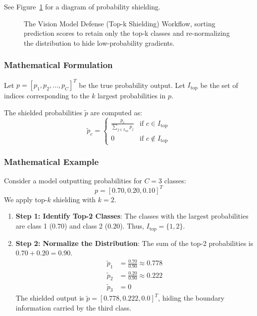 \documentclass{article}
\begin{document}
See Figure~\ref{fig:defense_vision_models} for a diagram of probability shielding.

\begin{figure}[htbp]
    \centering
    \caption{The Vision Model Defense (Top-k Shielding) Workflow, sorting prediction scores to retain only the top-k classes and re-normalizing the distribution to hide low-probability gradients.}
    \label{fig:defense_vision_models}
\end{figure}

\subsubsection{Mathematical Formulation}
Let $p = [p_1, p_2, \dots, p_C]^T$ be the true probability output. Let $I_{\text{top}}$ be the set of indices corresponding to the $k$ largest probabilities in $p$.

The shielded probabilities $\tilde{p}$ are computed as:
\begin{equation}
    \tilde{p}_c = 
    \begin{cases}
        \frac{p_c}{\sum_{j \in I_{\text{top}}} p_j} & \text{if } c \in I_{\text{top}} \\
        0 & \text{if } c \notin I_{\text{top}}
    \end{cases}
\end{equation}

\subsubsection{Mathematical Example}
Consider a model outputting probabilities for $C=3$ classes:
$$p = [0.70, 0.20, 0.10]^T$$
We apply top-$k$ shielding with $k = 2$.
\begin{enumerate}
    \item \textbf{Step 1: Identify Top-2 Classes}: The classes with the largest probabilities are class 1 ($0.70$) and class 2 ($0.20$). Thus, $I_{\text{top}} = \{1, 2\}$.
    \item \textbf{Step 2: Normalize the Distribution}: The sum of the top-2 probabilities is $0.70 + 0.20 = 0.90$.
    \begin{align*}
        \tilde{p}_1 &= \frac{0.70}{0.90} \approx 0.778 \\
        \tilde{p}_2 &= \frac{0.20}{0.90} \approx 0.222 \\
        \tilde{p}_3 &= 0
    \end{align*}
    The shielded output is $\tilde{p} = [0.778, 0.222, 0.0]^T$, hiding the boundary information carried by the third class.
\end{enumerate}
\end{document}
